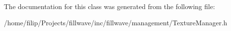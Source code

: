 The documentation for this class was generated from the following file\+:\begin{DoxyCompactItemize}
\item 
/home/filip/\+Projects/fillwave/inc/fillwave/management/Texture\+Manager.\+h\end{DoxyCompactItemize}
